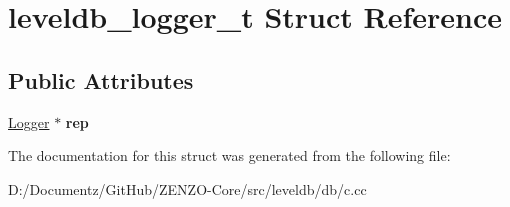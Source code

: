 \hypertarget{structleveldb__logger__t}{}\section{leveldb\+\_\+logger\+\_\+t Struct Reference}
\label{structleveldb__logger__t}
\subsection*{Public Attributes}
\begin{DoxyCompactItemize}
\item 
\mbox{\label{structleveldb__logger__t_aa27dd9e07077dbde7b776c8f548c749b}} 
\mbox{\hyperlink{classleveldb_1_1_logger}{Logger}} $\ast$ {\bfseries rep}
\end{DoxyCompactItemize}


The documentation for this struct was generated from the following file\+:\begin{DoxyCompactItemize}
\item 
D\+:/\+Documentz/\+Git\+Hub/\+Z\+E\+N\+Z\+O-\/\+Core/src/leveldb/db/c.\+cc\end{DoxyCompactItemize}
